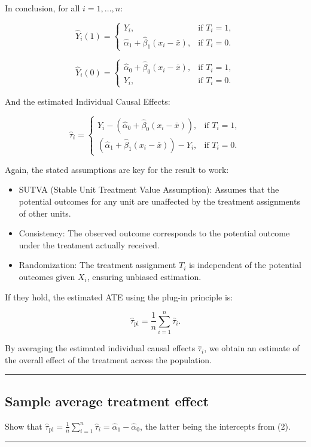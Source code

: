 \documentclass{article}
\newenvironment{colorparagraph}[1]{\par\color{#1}}{\par}
\begin{document}
In conclusion, for all \(i = 1, \dots, n\):

\[
\hat{Y}_i(1) = \begin{cases}
    Y_i, & \text{if } T_i = 1, \\
    \hat{\alpha}_1 + \hat{\beta}_1 (x_i - \bar{x}), & \text{if } T_i = 0.
\end{cases}
\]

\[
\hat{Y}_i(0) = \begin{cases}
    \hat{\alpha}_0 + \hat{\beta}_0 (x_i - \bar{x}), & \text{if } T_i = 1, \\
    Y_i, & \text{if } T_i = 0.
\end{cases}
\]

And the estimated Individual Causal Effects:

\[
\hat{\tau}_i = \begin{cases}
    Y_i - \left( \hat{\alpha}_0 + \hat{\beta}_0 (x_i - \bar{x}) \right), & \text{if } T_i = 1, \\
    \left( \hat{\alpha}_1 + \hat{\beta}_1 (x_i - \bar{x}) \right) - Y_i, & \text{if } T_i = 0.
\end{cases}
\]

Again, the stated assumptions are key for the result to work:

\begin{itemize}
    \item SUTVA (Stable Unit Treatment Value Assumption): Assumes that the potential outcomes for any unit are unaffected by the treatment assignments of other units.
    \item Consistency: The observed outcome corresponds to the potential outcome under the treatment actually received.
    \item Randomization: The treatment assignment \(T_i\) is independent of the potential outcomes given \(X_i\), ensuring unbiased estimation.
\end{itemize}

If they hold, the estimated ATE using the plug-in principle is:

\[
\hat{\tau}_{\text{pi}} = \frac{1}{n} \sum_{i=1}^{n} \hat{\tau}_i.
\]

By averaging the estimated individual causal effects \(\hat{\tau}_i\), we obtain an estimate of the overall effect of the treatment across the population.

\begin{colorparagraph}{questioncolor}
\rule{\textwidth}{0.5pt}

\label{q2h}\subsection{Sample average treatment effect}
Show that \(\hat{\tau}_{\text{pi}} = \frac{1}{n} \sum_{i=1}^{n} \hat{\tau}_i = \hat{\alpha}_1 - \hat{\alpha}_0\), the latter being the intercepts from (2).

\rule{\textwidth}{0.5pt}
\end{colorparagraph}
\end{document}
